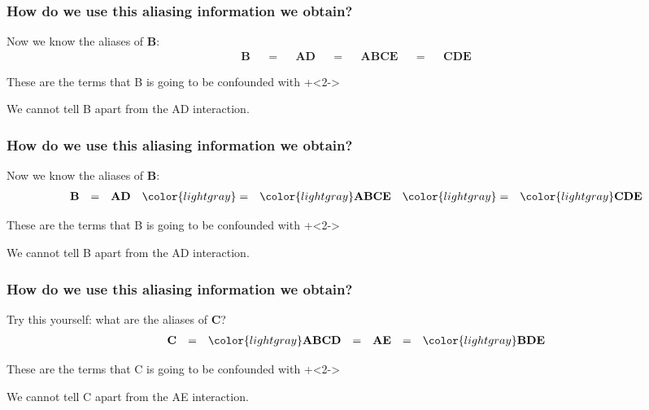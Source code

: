 \begin{frame}\frametitle{How do we use this aliasing information we obtain?}
	Now we know the aliases of \textbf{B}:
	\begin{align*}
		\textbf{B} &&=&& \textbf{AD} &&=&& \textbf{ABCE} &&=&& \textbf{CDE}
	\end{align*}
	
	\vspace{1cm}
	\begin{itemize}
		\item	These are the terms that B is going to be confounded with
		\onslide+<2->{\item	We cannot tell B apart from the AD interaction.}
	\end{itemize}
\end{frame}

\begin{frame}\frametitle{How do we use this aliasing information we obtain?}
	Now we know the aliases of \textbf{B}:
	\begin{align*}
		\textbf{B} &&=&& \textbf{AD} &&\color{lightgray}=&& {\color{lightgray}\textbf{ABCE}} &&\color{lightgray}=&& \color{lightgray} \textbf{CDE}
	\end{align*}
	
	\vspace{1cm}
	\begin{itemize}
		\item	These are the terms that B is going to be confounded with
		\onslide+<2->{\item	We cannot tell B apart from the AD interaction.}
	\end{itemize}
\end{frame}

\begin{frame}\frametitle{How do we use this aliasing information we obtain?}
	Try this yourself: what are the aliases of \textbf{C}?
	\pause
	\begin{align*}
		\textbf{C} &&=&& \color{lightgray}\textbf{ABCD} &&=&& \textbf{AE} &&=&&\color{lightgray} \textbf{BDE}
	\end{align*}
	
	
	\vspace{1cm}
	\begin{itemize}
		\item	These are the terms that C is going to be confounded with
		\onslide+<2->{\item	We cannot tell C apart from the AE interaction.}
	\end{itemize}
\end{frame}

